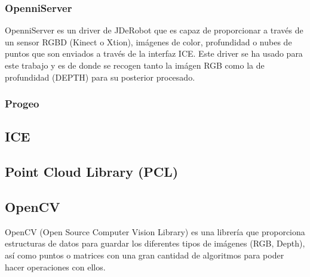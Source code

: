 \subsubsection{OpenniServer}

OpenniServer es un driver de JDeRobot que es capaz de proporcionar a través de un sensor RGBD (Kinect o Xtion), imágenes de color, profundidad o nubes de puntos que son enviados a través de la interfaz ICE. Este driver se ha usado para este trabajo y es de donde se recogen tanto la imágen RGB como la de profundidad (DEPTH) para su posterior procesado.

\subsubsection{Progeo}

\subsection{ICE}

\subsection{Point Cloud Library (PCL)}

\subsection{OpenCV}

OpenCV (Open Source Computer Vision Library) es una librería que proporciona estructuras de datos para guardar los diferentes tipos de imágenes (RGB, Depth), así como puntos o matrices con una gran cantidad de algoritmos para poder hacer operaciones con ellos.
